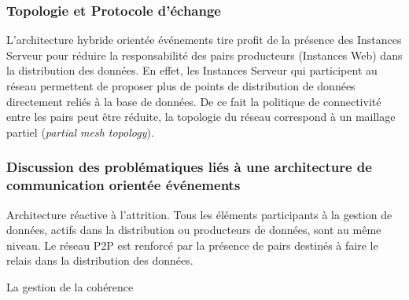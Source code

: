 \subsubsection{Topologie et Protocole d'échange}
L'architecture hybride orientée \og événements\fg{} tire profit de la présence des 
Instances Serveur pour réduire la responsabilité des pairs producteurs (Instances 
Web) dans la distribution des données. En effet, les Instances Serveur qui 
participent au réseau permettent de proposer plus de points de distribution de 
données directement reliés à la base de données. De ce fait la politique de 
connectivité entre les pairs peut être réduite, la topologie du réseau correspond à 
un maillage partiel (\textit{partial mesh topology}). 
\subsubsection{Discussion des problématiques liés à une architecture de 
communication orientée \og événements\fg{}}
Architecture réactive à l'attrition. Tous les éléments participants à la gestion de 
données, actifs dans la distribution ou producteurs de données, sont au même 
niveau. Le réseau \gls{P2P} est renforcé par la présence de pairs destinés à 
faire le relais dans la distribution des données. 

La gestion de la cohérence 


%
%
%





